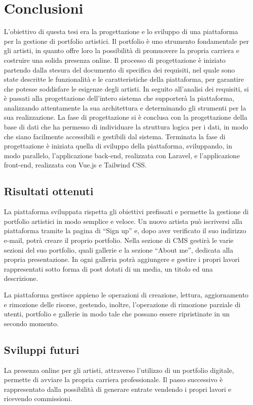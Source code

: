 \chapter{Conclusioni}\label{cap:conclusioni}
L'obiettivo di questa tesi era la progettazione e lo sviluppo di una piattaforma per la gestione di portfolio artistici. Il portfolio \`e uno strumento fondamentale per gli artisti, in quanto offre loro la possibilit\`a di promuovere la propria carriera e costruire una solida presenza online. Il processo di progettazione \`e iniziato partendo dalla stesura del documento di specifica dei requisiti, nel quale sono state descritte le funzionalit\`a e le caratteristiche della piattaforma, per garantire che potesse soddisfare le esigenze degli artisti. In seguito all'analisi dei requisiti, si \`e passati alla progettazione dell'intero sistema che supporter\`a la piattaforma, analizzando attentamente la sua architettura e determinando gli strumenti per la sua realizzazione. La fase di progettazione si \`e conclusa con la progettazione della base di dati che ha permesso di individuare la struttura logica per i dati, in modo che siano facilmente accessibili e gestibili dal sistema. Terminata la fase di progettazione \`e iniziata quella di sviluppo della piattaforma, sviluppando, in modo parallelo, l'applicazione back-end, realizzata con Laravel, e l'applicazione front-end, realizzata con Vue.js e Tailwind CSS.
\section{Risultati ottenuti}
La piattaforma sviluppata rispetta gli obiettivi prefissati e permette la gestione di portfolio artistici in modo semplice e veloce. Un nuovo artista pu\`o iscriversi alla piattaforma tramite la pagina di ``Sign up'' e, dopo aver verificato il suo indirizzo e-mail, potr\`a creare il proprio portfolio.  Nella sezione di CMS gestir\`a le varie sezioni del suo portfolio, quali gallerie e la sezione ``About me'', dedicata alla propria presentazione. In ogni galleria potr\`a aggiungere e gestire i propri lavori rappresentati sotto forma di post dotati di un media, un titolo ed una descrizione.

La piattaforma gestisce appieno le operazioni di creazione, lettura, aggiornamento e rimozione delle risorse, gestendo, inoltre, l'operazione di rimozione parziale di utenti, portfolio e gallerie in modo tale che possano essere ripristinate in un secondo momento.
\section{Sviluppi futuri}
La presenza online per gli artisti, attraverso l'utilizzo di un portfolio digitale, permette di avviare la propria carriera professionale.  Il passo successivo \`e rappresentato dalla possibilit\`a di generare entrate vendendo i propri lavori e ricevendo commissioni.

